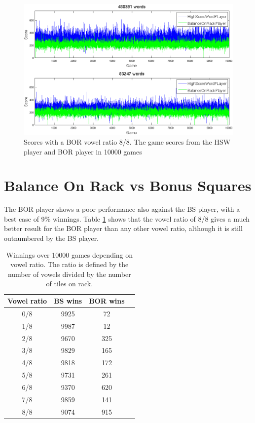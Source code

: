 \documentclass[a4paper, 12pt]{report}
\begin{document}
\graphicspath{{../results/Plots/}}

\begin{figure}[h]
\centering
\includegraphics[scale=0.4]{HighBalance8vow_bothDict_cropped}
\caption {Scores with a BOR vowel ratio 8/8. The game scores from the HSW player and BOR player in 10000 games}
\label{fig:highBalanceBothDict}
\end{figure}




\section{Balance On Rack vs Bonus Squares}
\label{sec:balanceBonus}
The BOR player shows a poor performance also against the BS player, with a best case of 9\% winnings. Table \ref{tab:bor+bs} shows that the vowel ratio of 8/8 gives a much better result for the BOR player than any other vowel ratio, although it is still outnumbered by the BS player.

\begin{table}[h]
\centering
    \begin{tabular}{ c | c | c  p{5cm}}
   	Vowel ratio & BS wins & BOR wins \\ \hline
	0/8 & 9925 & 72 \\ 
    	1/8 & 9987 & 12 \\ 
    	2/8 & 9670 & 325 \\ 
    	3/8 & 9829 & 165 \\ 
	4/8 & 9818 & 172 \\ 
	5/8 & 9731 & 261 \\ 
	6/8 & 9370 & 620 \\ 
	7/8 & 9859 & 141 \\ 
	8/8 & 9074 & 915 \\ 
    \end{tabular}
\caption{Winnings over 10000 games depending on vowel ratio. The ratio is defined by the number of vowels divided by the number of tiles on rack.}
\label{tab:bor+bs}
\end{table}
\end{document}
